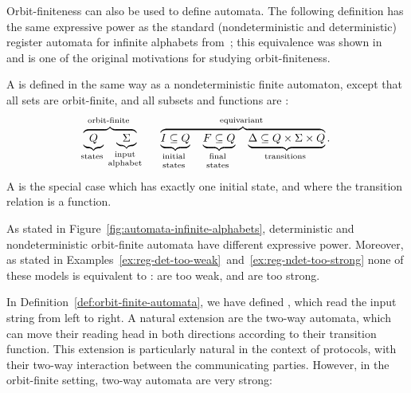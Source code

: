 Orbit-finiteness can also be used to define automata. The following definition
has the same expressive power as the standard (nondeterministic and
deterministic) register automata for infinite alphabets
from~\cite{kaminskiFiniteMemoryAutomata1994}; this equivalence was shown
in~\cite[Lemma 6.3]{bojanczykAutomataTheoryNominal2014} and is one of the
original motivations for studying orbit-finiteness.

\begin{definition}
    \label{def:orbit-finite-automata}
    \AP
    A  is defined in the same way as a 
    nondeterministic finite automaton, except that all sets are orbit-finite, 
    and all subsets and functions are :
\begin{align*}
    \myoverbrace{
        \myunderbrace{Q}{states} \quad 
        \myunderbrace{\Sigma}{input \\ alphabet}
    }
    {orbit-finite}
    \qquad
    \myoverbrace{
        \myunderbrace{I \subseteq Q}{initial \\ states} \quad 
        \myunderbrace{F \subseteq Q}{final \\ states} \quad 
        \myunderbrace{\Delta \subseteq Q \times \Sigma \times Q}{transitions}
    }{equivariant}.
\end{align*}
A 
is the special case which has exactly one initial state, and where the transition relation is a function.
\end{definition}

As stated in Figure~\ref{fig:automata-infinite-alphabets}, deterministic and
nondeterministic orbit-finite automata have different expressive power.
Moreover, as stated in Examples~\ref{ex:reg-det-too-weak}~and~\ref{ex:reg-ndet-too-strong}
none of these models is equivalent to :
 are too weak, and 
 are too
strong. 

In Definition~\ref{def:orbit-finite-automata}, we have defined , which read the input string from left to right. A
natural extension are the two-way automata, which can move their reading head
in both directions according to their transition function. This extension is
particularly natural in the context of protocols, with their two-way
interaction between the communicating parties. However, in the orbit-finite
setting, two-way automata are very strong:

